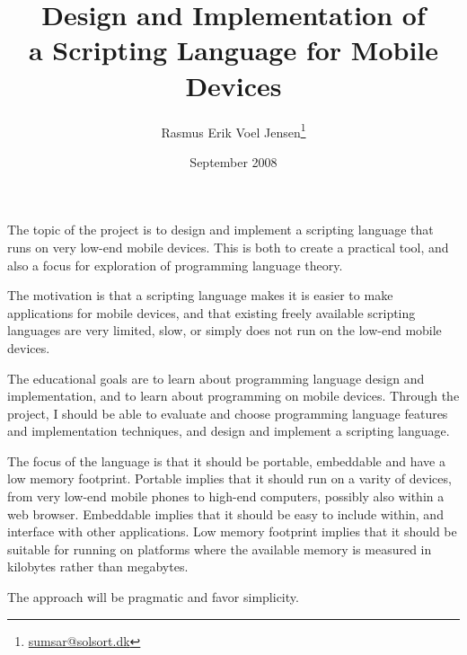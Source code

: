 \documentclass[12pt]{article}
\title{Design and Implementation of \\ a Scripting Language for Mobile Devices}
\author{Rasmus Erik Voel Jensen\footnote{\url{sumsar@solsort.dk}}
}
\date{September 2008}
\begin{document}
\maketitle


    The topic of the project is to design and implement a scripting language
that runs on very low-end mobile devices. This is both to create a practical tool, and
also a focus for exploration of programming language theory. 

The motivation is that a scripting language makes it is easier to make applications for mobile 
devices, and that existing freely available scripting languages
are very limited, slow, or simply does not run on the low-end mobile devices.

    The educational goals are to learn about programming language design and
implementation, and to learn about programming on mobile devices. Through the
project, I should be able to evaluate and choose programming language features
and implementation techniques, and design and implement a scripting language.

    The focus of the language is that it should be portable, embeddable and have
a low memory footprint. Portable implies that it should run on a varity of devices,
from very low-end mobile phones to high-end computers, possibly also within a web browser. 
Embeddable implies that it should be easy to include within, and interface with
other applications. Low memory footprint implies that it should be suitable for
running on platforms where the available memory is measured in kilobytes rather
than megabytes. 

    The approach will be pragmatic and favor simplicity.
\end{document}
